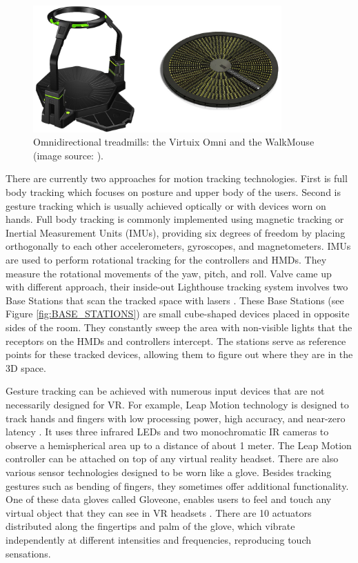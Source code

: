 \begin{figure}[th]
\centering
\includegraphics[width=0.85\textwidth]{img/vr_threadmills.png}
\caption{Omnidirectional treadmills: the Virtuix Omni and the WalkMouse (image source: \cite{VR_TECHNOLOGY}).}
\label{fig:VIRTUX_IMAGE}
\end{figure}

There are currently two approaches for motion tracking technologies. First is full body tracking which focuses on posture and upper body of the users. Second is gesture tracking which is usually achieved optically or with devices worn on hands. Full body tracking is commonly implemented using magnetic tracking or Inertial Measurement Units (IMUs), providing six degrees of freedom by placing orthogonally to each other accelerometers, gyroscopes, and magnetometers. IMUs are used to perform rotational tracking for the controllers and HMDs. They measure the rotational movements of the yaw, pitch, and roll. Valve came up with different approach, their inside-out Lighthouse tracking system involves two Base Stations that scan the tracked space with lasers \cite{VIVE}. These Base Stations (see Figure \ref{fig:BASE_STATIONS}) are small cube-shaped devices placed in opposite sides of the room. They constantly sweep the area with non-visible lights that the receptors on the HMDs and controllers intercept. The stations serve as reference points for these tracked devices, allowing them to figure out where they are in the 3D space. 

Gesture tracking can be achieved with numerous input devices that are not necessarily designed for VR. For example, Leap Motion technology is designed to track hands and fingers with low processing power, high accuracy, and near-zero latency \cite{LEAP_MOTION}. It uses three infrared LEDs and two monochromatic IR cameras to observe a hemispherical area up to a distance of about 1 meter.  The Leap Motion controller can be attached on top of any virtual reality headset. There are also various sensor technologies designed to be worn like a glove. Besides tracking gestures such as bending of fingers, they sometimes offer additional functionality. One of these data gloves called Gloveone, enables users to feel and touch any virtual object that they can see in VR headsets \cite{GLOVEONE}. There are 10 actuators distributed along the fingertips and palm of the glove, which vibrate independently at different intensities and frequencies, reproducing touch sensations.

